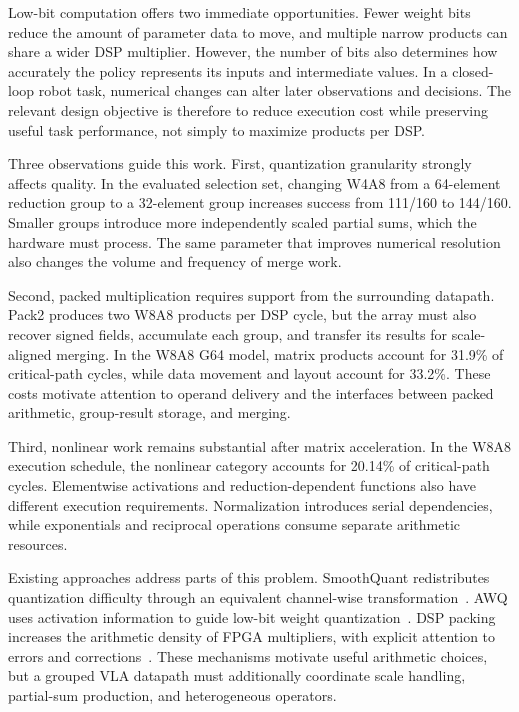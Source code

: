 \documentclass[journal,10pt]{IEEEtran}
\begin{document}
Low-bit computation offers two immediate opportunities. Fewer weight bits reduce the amount of parameter data to move, and multiple narrow products can share a wider DSP multiplier. However, the number of bits also determines how accurately the policy represents its inputs and intermediate values. In a closed-loop robot task, numerical changes can alter later observations and decisions. The relevant design objective is therefore to reduce execution cost while preserving useful task performance, not simply to maximize products per DSP.

Three observations guide this work. First, quantization granularity strongly affects quality. In the evaluated selection set, changing W4A8 from a 64-element reduction group to a 32-element group increases success from 111/160 to 144/160. Smaller groups introduce more independently scaled partial sums, which the hardware must process. The same parameter that improves numerical resolution also changes the volume and frequency of merge work.

Second, packed multiplication requires support from the surrounding datapath. Pack2 produces two W8A8 products per DSP cycle, but the array must also recover signed fields, accumulate each group, and transfer its results for scale-aligned merging. In the W8A8 G64 model, matrix products account for 31.9\% of critical-path cycles, while data movement and layout account for 33.2\%. These costs motivate attention to operand delivery and the interfaces between packed arithmetic, group-result storage, and merging.

Third, nonlinear work remains substantial after matrix acceleration. In the W8A8 execution schedule, the nonlinear category accounts for 20.14\% of critical-path cycles. Elementwise activations and reduction-dependent functions also have different execution requirements. Normalization introduces serial dependencies, while exponentials and reciprocal operations consume separate arithmetic resources.

Existing approaches address parts of this problem. SmoothQuant redistributes quantization difficulty through an equivalent channel-wise transformation~\cite{smoothquant}. %
AWQ uses activation information to guide low-bit weight quantization~\cite{awq}. %
DSP packing increases the arithmetic density of FPGA multipliers, with explicit attention to errors and corrections~\cite{dsppacking}. %
These mechanisms motivate useful arithmetic choices, but a grouped VLA datapath must additionally coordinate scale handling, partial-sum production, and heterogeneous operators.
\end{document}
